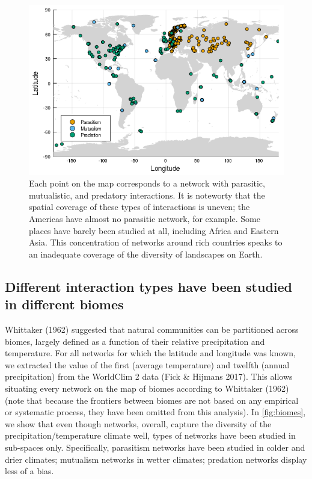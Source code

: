 \begin{figure}
\centering
\includegraphics{figures/figure_01_c.png}
\caption{Each point on the map corresponds to a network with parasitic,
mutualistic, and predatory interactions. It is noteworty that the
spatial coverage of these types of interactions is uneven; the Americas
have almost no parasitic network, for example. Some places have barely
been studied at all, including Africa and Eastern Asia. This
concentration of networks around rich countries speaks to an inadequate
coverage of the diversity of landscapes on Earth.\label{fig:spatial}}
\end{figure}

\hypertarget{different-interaction-types-have-been-studied-in-different-biomes}{%
\subsection{Different interaction types have been studied in different
biomes}\label{different-interaction-types-have-been-studied-in-different-biomes}}

Whittaker (1962) suggested that natural communities can be partitioned
across biomes, largely defined as a function of their relative
precipitation and temperature. For all networks for which the latitude
and longitude was known, we extracted the value of the first (average
temperature) and twelfth (annual precipitation) from the WorldClim 2
data (Fick \& Hijmans 2017). This allows situating every network on the
map of biomes according to Whittaker (1962) (note that because the
frontiers between biomes are not based on any empirical or systematic
process, they have been omitted from this analysis). In
\cref{fig:biomes}, we show that even though networks,
overall, capture the diversity of the precipitation/temperature climate
well, types of networks have been studied in sub-spaces only.
Specifically, parasitism networks have been studied in colder and drier
climates; mutualism networks in wetter climates; predation networks
display less of a bias.

